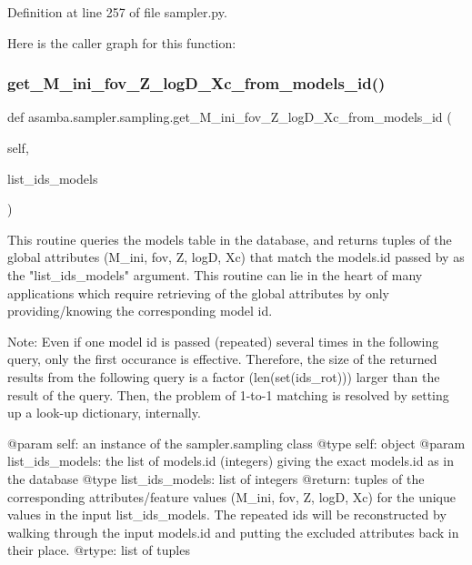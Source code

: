 Definition at line 257 of file sampler.\+py.

Here is the caller graph for this function\+:
\mbox{\label{classasamba_1_1sampler_1_1sampling_a64ed2afa6e77447a36512136da5b500a}} 
\subsubsection{\texorpdfstring{get\+\_\+\+M\+\_\+ini\+\_\+fov\+\_\+\+Z\+\_\+log\+D\+\_\+\+Xc\+\_\+from\+\_\+models\+\_\+id()}{get\_M\_ini\_fov\_Z\_logD\_Xc\_from\_models\_id()}}
{\footnotesize\ttfamily def asamba.\+sampler.\+sampling.\+get\+\_\+\+M\+\_\+ini\+\_\+fov\+\_\+\+Z\+\_\+log\+D\+\_\+\+Xc\+\_\+from\+\_\+models\+\_\+id (\begin{DoxyParamCaption}\item[{}]{self,  }\item[{}]{list\+\_\+ids\+\_\+models }\end{DoxyParamCaption})}

\begin{DoxyVerb}This routine queries the models table in the database, and returns tuples of the global attributes
(M_ini, fov, Z, logD, Xc) that match the models.id passed by as the "list_ids_models" argument.
This routine can lie in the heart of many applications which require retrieving of the global attributes
by only providing/knowing the corresponding model id.

Note: Even if one model id is passed (repeated) several times in the following query, only the first
occurance is effective. Therefore, the size of the returned results from the following query
is a factor (len(set(ids_rot))) larger than the result of the query. Then, the problem of 1-to-1
matching is resolved by setting up a look-up dictionary, internally.

@param self: an instance of the sampler.sampling class
@type self: object
@param list_ids_models: the list of models.id (integers) giving the exact models.id as in the database
@type list_ids_models: list of integers
@return: tuples of the corresponding attributes/feature values (M_ini, fov, Z, logD, Xc) for the unique
  values in the input list_ids_models. The repeated ids will be reconstructed by walking through the
  input models.id and putting the excluded attributes back in their place.
@rtype: list of tuples
\end{DoxyVerb}
 

